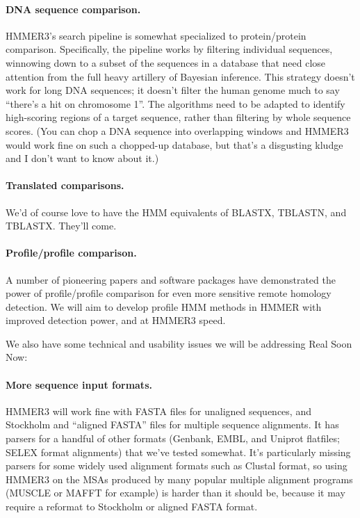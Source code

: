 \paragraph{DNA sequence comparison.} HMMER3's search pipeline is somewhat
specialized to protein/protein comparison. Specifically, the pipeline
works by filtering individual sequences, winnowing down to a subset of
the sequences in a database that need close attention from the full
heavy artillery of Bayesian inference. This strategy doesn't work for
long DNA sequences; it doesn't filter the human genome much to say
``there's a hit on chromosome 1''. The algorithms need to be adapted
to identify high-scoring regions of a target sequence, rather than
filtering by whole sequence scores. (You can chop a DNA sequence into
overlapping windows and HMMER3 would work fine on such a chopped-up
database, but that's a disgusting kludge and I don't want to know
about it.)

\paragraph{Translated comparisons.} We'd of course love to have the HMM
equivalents of BLASTX, TBLASTN, and TBLASTX. They'll come.

\paragraph{Profile/profile comparison.} A number of pioneering papers and
software packages have demonstrated the power of profile/profile
comparison for even more sensitive remote homology detection. We will
aim to develop profile HMM methods in HMMER with improved detection
power, and at HMMER3 speed.

\vspace{2em}

We also have some technical and usability issues we will be addressing
Real Soon Now:

\paragraph{More sequence input formats.} HMMER3 will work fine with FASTA
files for unaligned sequences, and Stockholm and ``aligned FASTA''
files for multiple sequence alignments. It has parsers for a handful
of other formats (Genbank, EMBL, and Uniprot flatfiles; SELEX format
alignments) that we've tested somewhat. It's particularly missing
parsers for some widely used alignment formats such as Clustal format,
so using HMMER3 on the MSAs produced by many popular multiple
alignment programs (MUSCLE or MAFFT for example) is harder than it
should be, because it may require a reformat to Stockholm or aligned
FASTA format.

